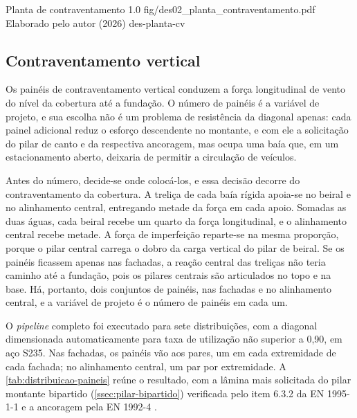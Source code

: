 \figura
{Planta de contraventamento}
{1.0}
{fig/des02_planta_contraventamento.pdf}
{Elaborado pelo autor (2026)}
{des-planta-cv}
{}
{}

\subsection{Contraventamento vertical}\label{ssec:predim-cv-vertical}

Os painéis de contraventamento vertical conduzem a força longitudinal de vento
do nível da cobertura até a fundação. O número de painéis é a variável de
projeto, e sua escolha não é um problema de resistência da diagonal apenas: cada
painel adicional reduz o esforço descendente no montante, e com ele a solicitação
do pilar de canto e da respectiva ancoragem, mas ocupa uma baía que, em um
estacionamento aberto, deixaria de permitir a circulação de veículos.

Antes do número, decide-se onde colocá-los, e essa decisão decorre do
contraventamento da cobertura. A treliça de cada baía rígida apoia-se no beiral e
no alinhamento central, entregando metade da força em cada apoio. Somadas as duas
águas, cada beiral recebe um quarto da força longitudinal, e o alinhamento
central recebe metade. A força de imperfeição reparte-se na mesma proporção,
porque o pilar central carrega o dobro da carga vertical do pilar de beiral. Se
os painéis ficassem apenas nas fachadas, a reação central das treliças não teria
caminho até a fundação, pois os pilares centrais são articulados no topo e na
base. Há, portanto, dois conjuntos de painéis, nas fachadas e no alinhamento
central, e a variável de projeto é o número de painéis em cada um.

O \textit{pipeline} completo foi executado para sete distribuições, com a
diagonal dimensionada automaticamente para taxa de utilização não superior a
0,90, em aço S235. Nas fachadas, os painéis vão aos pares, um em cada
extremidade de cada fachada; no alinhamento central, um par por extremidade. A
\autoref{tab:distribuicao-paineis} reúne o resultado, com a lâmina mais solicitada
do pilar montante bipartido (\autoref{ssec:pilar-bipartido}) verificada pelo item
6.3.2 da EN 1995-1-1 \cite{EN1995-1-1:2004} e a ancoragem pela EN 1992-4
\cite{EN1992-4:2018}.

